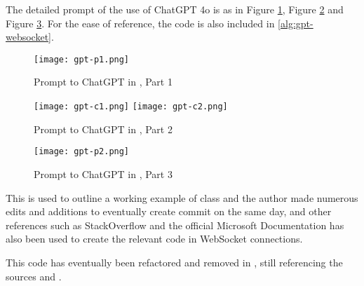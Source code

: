 The detailed prompt of the use of ChatGPT 4o \cite{gpt-websocket} is as in Figure \ref{fig:gpt-websocket-1}, Figure \ref{fig:gpt-websocket-2} and Figure \ref{fig:gpt-websocket-3}. For the ease of reference, the code is also included in \ref{alg:gpt-websocket}.

\begin{figure}[!ht]
    \centering

    \texttt{[image: gpt-p1.png]}
    \caption[Prompt to ChatGPT in \cite{gpt-websocket}, Part 1]{Prompt to ChatGPT in \cite{gpt-websocket}, Part 1}
    \label{fig:gpt-websocket-1}
\end{figure}

\begin{figure}[!ht]
    \centering

    \texttt{[image: gpt-c1.png]}
    \texttt{[image: gpt-c2.png]}

    \caption[Prompt to ChatGPT in \cite{gpt-websocket}, Part 2]{Prompt to ChatGPT in \cite{gpt-websocket}, Part 2}
    \label{fig:gpt-websocket-2}
\end{figure}

\begin{figure}[!ht]
    \centering

    \texttt{[image: gpt-p2.png]}

    \caption[Prompt to ChatGPT in \cite{gpt-websocket}, Part 3]{Prompt to ChatGPT in \cite{gpt-websocket}, Part 3}
    \label{fig:gpt-websocket-3}
\end{figure}

This is used to outline a working example of  class and the author made numerous edits and additions to eventually create commit  on the same day, and other references such as StackOverflow \cite{stackoverflow-websocket-demo}\cite{stackoverflow-websocket-demo-2} and the official Microsoft Documentation \cite{dotnet-reference-clientwebsocket} has also been used to create the relevant code in WebSocket connections.

This code has eventually been refactored and removed in , still referencing the sources \cite{stackoverflow-websocket-demo} and \cite{stackoverflow-websocket-demo-2}.